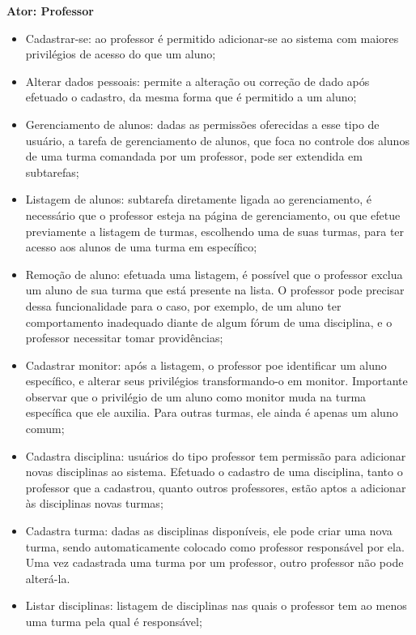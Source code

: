 \documentclass[12pt,letterpaper]{article}
\begin{document}
\vspace{1cm}
{\large {\bf Ator: Professor}}
\vspace{0.5cm}

\begin{itemize}
\item{}Cadastrar-se: ao professor é permitido adicionar-se ao sistema com maiores privilégios de acesso do que um aluno;
\item{}Alterar dados pessoais: permite a alteração ou correção de dado após efetuado o cadastro, da mesma forma que é permitido a um aluno;
\item{}Gerenciamento de alunos: dadas as permissões oferecidas a esse tipo de usuário, a tarefa de gerenciamento de alunos, que foca no controle dos alunos de uma turma comandada por um professor, pode ser extendida em subtarefas;
\item{}Listagem de alunos: subtarefa diretamente ligada ao gerenciamento, é necessário que o professor esteja na página de gerenciamento, ou que efetue previamente a listagem de turmas, escolhendo uma de suas turmas, para ter acesso aos alunos de uma turma em específico;
\item{}Remoção de aluno: efetuada uma listagem, é possível que o professor exclua um aluno de sua turma que está presente na lista. O professor pode precisar dessa funcionalidade para o caso, por exemplo, de um aluno ter comportamento inadequado diante de algum fórum de uma disciplina, e o professor necessitar tomar providências;
\item{}Cadastrar monitor: após a listagem, o professor poe identificar um aluno específico, e alterar seus privilégios transformando-o em monitor. Importante observar que o privilégio de um aluno como monitor muda na turma específica que ele auxilia. Para outras turmas, ele ainda é apenas um aluno comum;
\item{}Cadastra disciplina: usuários do tipo professor tem permissão para adicionar novas disciplinas ao sistema. Efetuado o cadastro de uma disciplina, tanto o professor que a cadastrou, quanto outros professores, estão aptos a adicionar às disciplinas novas turmas;
\item{}Cadastra turma: dadas as disciplinas disponíveis, ele pode criar uma nova turma, sendo automaticamente colocado como professor responsável por ela. Uma vez cadastrada uma turma por um professor, outro professor não pode alterá-la. 
\item{}Listar disciplinas: listagem de disciplinas nas quais o professor tem ao menos uma turma pela qual é responsável;

\end{itemize}
\end{document}

